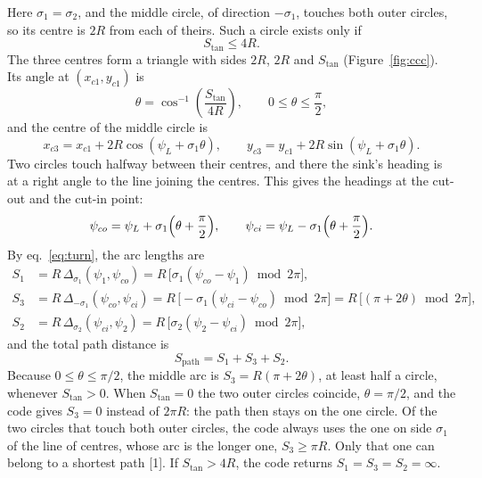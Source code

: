 \documentclass[10pt]{article}
\newcommand{\Stan}{S_{\tan}}
\newcommand{\Spath}{S_{\mathrm{path}}}
\newcommand{\Turn}{\Delta}
\begin{document}
Here $\sigma_1 = \sigma_2$, and the middle circle, of direction $-\sigma_1$, touches both outer circles, so its centre
is $2R$ from each of theirs. Such a circle exists only if
\begin{equation}
  \Stan \le 4R.
  \label{eq:ccc-exists}
\end{equation}
The three centres form a triangle with sides $2R$, $2R$ and $\Stan$ (Figure~\ref{fig:ccc}). Its angle at
$(x_{c1}, y_{c1})$ is
\begin{equation}
  \theta = \cos^{-1}\!\left(\frac{\Stan}{4R}\right), \qquad 0 \le \theta \le \frac{\pi}{2},
  \label{eq:theta}
\end{equation}
and the centre of the middle circle is
\begin{equation}
  x_{c3} = x_{c1} + 2R\cos(\psi_L + \sigma_1\theta), \qquad
  y_{c3} = y_{c1} + 2R\sin(\psi_L + \sigma_1\theta).
  \label{eq:c3}
\end{equation}
Two circles touch halfway between their centres, and there the sink's heading is at a right angle to the line joining
the centres. This gives the headings at the cut-out and the cut-in point:
\begin{equation}
  \psi_{co} = \psi_L + \sigma_1\Bigl(\theta + \frac{\pi}{2}\Bigr), \qquad
  \psi_{ci} = \psi_L - \sigma_1\Bigl(\theta + \frac{\pi}{2}\Bigr).
  \label{eq:ccc-headings}
\end{equation}
By eq.~\eqref{eq:turn}, the arc lengths are
\begin{equation}
  \begin{aligned}
  S_1 &= R\,\Turn_{\sigma_1}(\psi_1, \psi_{co}) = R\,\bigl[\sigma_1(\psi_{co} - \psi_1) \bmod 2\pi\bigr],\\
  S_3 &= R\,\Turn_{-\sigma_1}(\psi_{co}, \psi_{ci}) = R\,\bigl[-\sigma_1(\psi_{ci} - \psi_{co}) \bmod 2\pi\bigr]
       = R\,\bigl[(\pi + 2\theta) \bmod 2\pi\bigr],\\
  S_2 &= R\,\Turn_{\sigma_2}(\psi_{ci}, \psi_2) = R\,\bigl[\sigma_2(\psi_2 - \psi_{ci}) \bmod 2\pi\bigr],
  \end{aligned}
  \label{eq:ccc-arcs}
\end{equation}
and the total path distance is
\begin{equation}
  \boxed{\Spath = S_1 + S_3 + S_2.}
  \label{eq:ccc-total}
\end{equation}
Because $0 \le \theta \le \pi/2$, the middle arc is $S_3 = R(\pi + 2\theta)$, at least half a circle, whenever
$\Stan > 0$. When $\Stan = 0$ the two outer circles coincide, $\theta = \pi/2$, and the code gives $S_3 = 0$ instead
of $2\pi R$: the path then stays on the one circle. Of the two circles that touch both outer circles, the code always
uses the one on side $\sigma_1$ of the line of centres, whose arc is the longer one, $S_3 \ge \pi R$. Only that one
can belong to a shortest path [1]. If $\Stan > 4R$, the code returns $S_1 = S_3 = S_2 = \infty$.
\end{document}
